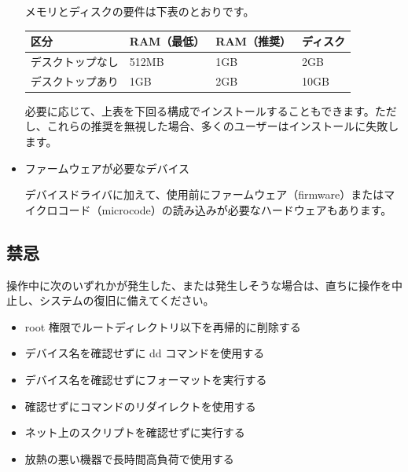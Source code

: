 \documentclass{article}
\begin{document}
\begin{multicols*}{3}
\begin{itemize}[leftmargin=*]
		メモリとディスクの要件は下表のとおりです。

		{\small\begin{tabularx}{\linewidth}{|X|X|X|X|}
			\hline
			区分 & RAM\newline （最低） & RAM\newline （推奨） & ディスク \\
			\hline
			デスクトップなし & 512MB & 1GB & 2GB \\
			\hline
			デスクトップあり & 1GB & 2GB & 10GB \\
			\hline
		\end{tabularx}}

		必要に応じて、上表を下回る構成でインストールすることもできます。ただし、これらの推奨を無視した場合、多くのユーザーはインストールに失敗します。

		\item ファームウェアが必要なデバイス

		デバイスドライバに加えて、使用前にファームウェア（firmware）またはマイクロコード（microcode）の読み込みが必要なハードウェアもあります。

	\end{itemize}


	\begin{tcolorbox}
	\section*{禁忌}
	\end{tcolorbox}

	操作中に次のいずれかが発生した、または発生しそうな場合は、直ちに操作を中止し、システムの復旧に備えてください。

	\begin{itemize}[leftmargin=*]
		\setlength{\itemsep}{0pt}
		\setlength{\parskip}{0pt}
		\setlength{\parsep}{0pt}

		\item root 権限でルートディレクトリ以下を再帰的に削除する
		\item デバイス名を確認せずに dd コマンドを使用する
		\item デバイス名を確認せずにフォーマットを実行する
		\item 確認せずにコマンドのリダイレクトを使用する
		\item ネット上のスクリプトを確認せずに実行する
		\item 放熱の悪い機器で長時間高負荷で使用する
	\end{itemize}


	\begin{tcolorbox}

\end{tcolorbox}
\end{multicols*}
\end{document}

